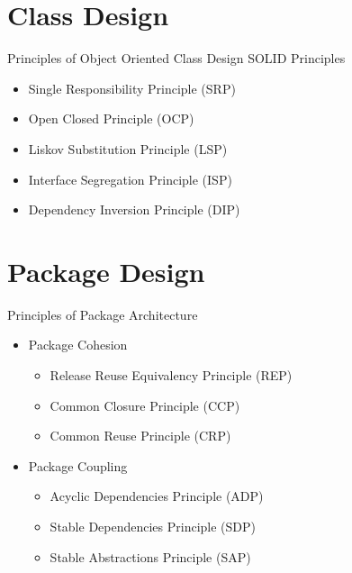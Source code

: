 \documentclass[xcolor=svgnames, handout]{beamer}
\begin{document}
\section{Class Design}


\begin{frame}{Principles of Object Oriented Class Design}
    SOLID Principles
    \begin{itemize}
        \item Single Responsibility Principle (SRP)
        \item Open Closed Principle (OCP)
        \item Liskov Substitution Principle (LSP)
        \item Interface Segregation Principle (ISP)
        \item Dependency Inversion Principle (DIP)
    \end{itemize}
\end{frame}


\section{Package Design}


\begin{frame}{Principles of Package Architecture}
    \begin{itemize}
        \item<1-> Package Cohesion
            \begin{itemize}
                \item<3-> Release Reuse Equivalency Principle (REP)
                \item<4-> Common Closure Principle (CCP)
                \item<5-> Common Reuse Principle (CRP)
            \end{itemize}
        \item<2-> Package Coupling
            \begin{itemize}
                \item<6-> Acyclic Dependencies Principle (ADP)
                \item<7-> Stable Dependencies Principle (SDP)
                \item<8-> Stable Abstractions Principle (SAP)
            \end{itemize}
    \end{itemize}
\end{frame}
\end{document}
